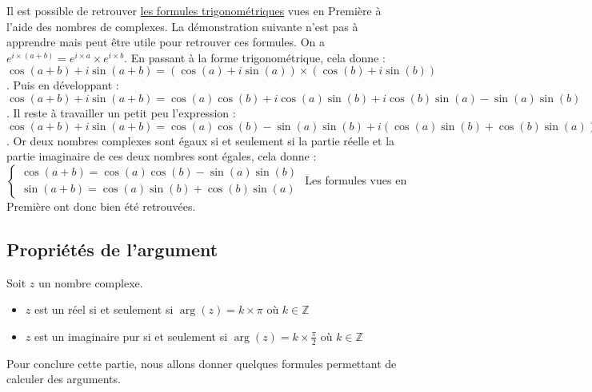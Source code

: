 	\begin{tip}
		\contentwidth[big]
		Il est possible de retrouver \href{https://bacomathiqu.es/cours/terminale/fonctions-trigonometriques/\#3-formules-de-trigonom\%C3\%A9trie}{les formules trigonométriques} vues en Première à l'aide des nombres de complexes. La démonstration suivante n'est pas à apprendre mais peut être utile pour retrouver ces formules.
		\newpar
		On a $e^{i \times (a + b)} = e^{i \times a} \times e^{i \times b}$.
		\newpar
		En passant à la forme trigonométrique, cela donne : $\cos(a + b) + i\sin(a + b) = (\cos(a) + i\sin(a)) \times (\cos(b) + i\sin(b))$.
		\newpar
		Puis en développant : $\cos(a + b) + i\sin(a + b) = \cos(a)\cos(b) + i\cos(a)\sin(b) + i\cos(b)\sin(a) - \sin(a)\sin(b)$.
		\newpar
		Il reste à travailler un petit peu l'expression : $\cos(a + b) + i\sin(a + b) = \cos(a)\cos(b) - \sin(a)\sin(b) + i(\cos(a)\sin(b) + \cos(b)\sin(a))$.
		\newpar
		Or deux nombres complexes sont égaux si et seulement si la partie réelle et la partie imaginaire de ces deux nombres sont égales, cela donne :
		\newpar
		$\begin{cases} \cos(a + b) = \cos(a)\cos(b) - \sin(a)\sin(b) \\ \sin(a + b) = \cos(a)\sin(b) + \cos(b)\sin(a) \end{cases}$
		\newpar
		Les formules vues en Première ont donc bien été retrouvées.
	\end{tip}
	
	\subsection{Propriétés de l'argument}
	
	\begin{formula}[Propriétés]
		Soit $z$ un nombre complexe.
		\begin{itemize}
			\item $z$ est un réel si et seulement si $\operatorname{arg}(z) = k \times \pi$ où $k \in \mathbb{Z}$
			\item $z$ est un imaginaire pur si et seulement si $\operatorname{arg}(z) = k \times \frac{\pi}{2}$ où $k \in \mathbb{Z}$
		\end{itemize}
	\end{formula}
	
	Pour conclure cette partie, nous allons donner quelques formules permettant de calculer des arguments.
	
